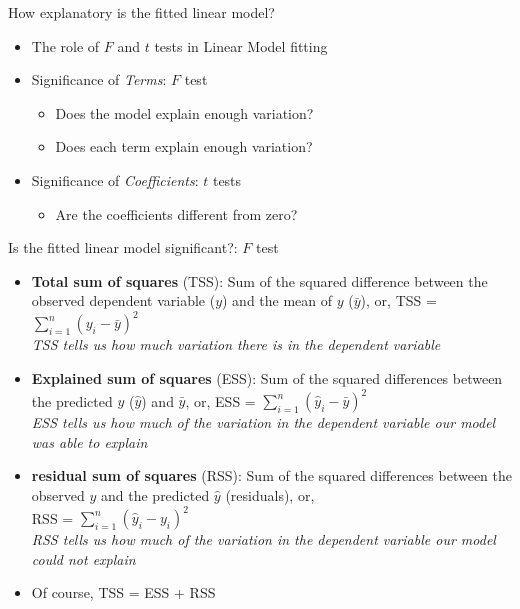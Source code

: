 \documentclass[xcolor=x11names,compress]{beamer}
\renewcommand{\(}{\begin{columns}}
\renewcommand{\)}{\end{columns}}
\newcommand{\<}[1]{\begin{column}{#1}}
\renewcommand{\>}{\end{column}}
\begin{document}
\begin{frame}{How explanatory is the fitted linear model?}

\begin{center}
\begin{itemize}[<+->]\itemsep20pt
\item The role of $F$ and $t$ tests in Linear Model fitting
\item Significance of {\it Terms}: $F$ test
\begin{itemize}
    \item Does the model explain enough variation?
    \item Does each term explain enough variation?
\end{itemize}
\item Significance of {\it Coefficients}: $t$ tests
\begin{itemize}
    \item Are the coefficients different from zero?
\end{itemize}
\end{itemize}

\end{center}
\end{frame}


\begin{frame}{Is the fitted linear model significant?: $F$ test}

\begin{itemize}[<+->]\itemsep6pt

\item {\bf Total sum of squares} (TSS): Sum of the squared difference between the observed dependent variable ($y$) and the mean of $y$ ($\bar{y}$), or,		
 TSS = $\sum_{i=1}^{n}(y_i - \bar{y})^2$\\
{\it TSS tells us how much variation there is in the dependent variable}

\item {\bf Explained sum of squares} (ESS): Sum of the squared 
differences between the predicted $y$ ($\hat{y}$) and $\bar{y}$, or,
ESS = $\sum_{i=1}^{n} (\hat{y}_i - \bar{y})^2$\\

{\it ESS tells us how much of the variation in the dependent variable 
our model was able to explain}

\item {\bf residual sum of squares} (RSS): Sum of the squared
differences between the observed $y$ and the predicted $\hat{y}$ (residuals), or, \\

RSS = $\sum_{i=1}^{n} (\hat{y}_i - y_i)^2$\\

{\it RSS tells us how much of the variation in the dependent variable
our model could not explain}

\item Of course, TSS = ESS + RSS

\end{itemize}

\end{frame}
\end{document}
